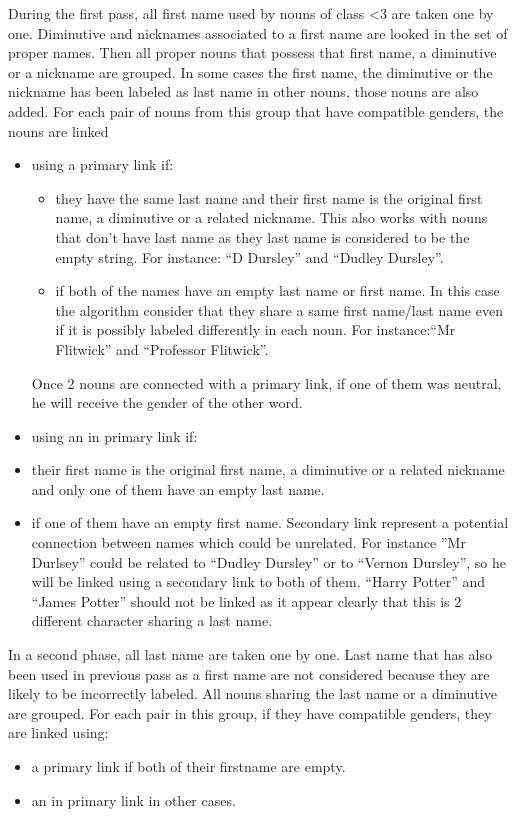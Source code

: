 \documentclass[a4paper, 12pt]{report}
\begin{document}
During the first pass, all first name used by nouns of class <3  are taken one by one. Diminutive and nicknames associated to a first name are looked in the set of proper names. Then all proper nouns that possess that first name, a diminutive or a nickname are grouped. In some cases the first name, the diminutive or the nickname has been labeled as last name in other nouns, those nouns are also added. For each pair of nouns from this group that have compatible genders, the nouns are linked
\begin{itemize}
\item
	 using a  primary link if:
	\begin{itemize}
	\item they have the same last name and their first name is the original first name, a diminutive or a related nickname. This also works with nouns that don't have last name as they last name is considered to be the empty string.  For instance: ``D Dursley'' and ``Dudley Dursley''. 
	\item if both of the names have an empty last name or first name. In this case the algorithm consider that they share a same first name/last name even if it is possibly labeled differently in each noun. For instance:``Mr Flitwick'' and ``Professor Flitwick''.
	\end{itemize}
	Once 2 nouns are connected with a  primary link, if one of them was neutral, he will receive the gender of the other word.
\item
	 using an  in primary link if:
	\item  their first name is the original first name, a diminutive or a related nickname and only one of them have an empty last name. 
	\item if one of them have an empty first name.
	Secondary  link represent a potential connection between names which could be unrelated. For instance ''Mr Durlsey'' could be related to ``Dudley Dursley'' or to ``Vernon Dursley'', so he will be linked using a secondary link to both of them. ``Harry Potter'' and ``James Potter'' should not be linked as it appear clearly that this is 2 different character sharing a last name.
\end{itemize}

In a second phase, all last name are taken one by one. Last name that has also been used in previous pass as a first name are not considered because they are likely to be incorrectly labeled. All nouns sharing the last name or a diminutive are grouped. For each pair in this group, if they have compatible genders, they are linked using:
\begin{itemize}
\item a  primary link if both of their firstname are empty. 
\item an in primary link in other cases.
\end{itemize}
\end{document}
